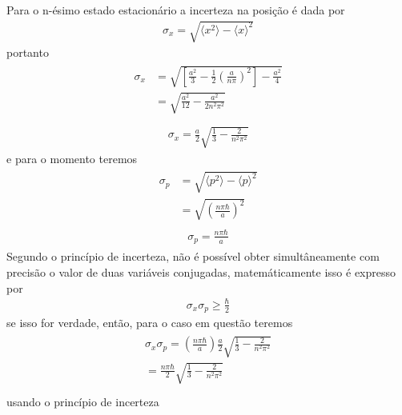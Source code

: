 \begin{prob}
\begin{sol}
		Para o n-ésimo estado estacionário a incerteza na posição é dada por	
		\begin{align}
			\sigma_{x}=\sqrt{\langle x^{2} \rangle -\langle x \rangle^{2}}
		\end{align}
		portanto	
		\begin{align}
			\begin{split}
				\sigma_{x} &= \sqrt{\left[\frac{a^{2}}{3}-\frac{1}{2}\left(\frac{a}{n \pi}\right)^{2}\right]-\frac{a^{2}}{4}}\\
									 &= \sqrt{\frac{a^{2}}{12}-\frac{a^{2}}{2n^{2} \pi^{2}}}\\
			\end{split}
		\end{align}
		\begin{align}
			\boxed{
				\sigma_{x} = \frac{a}{2}\sqrt{\frac{1}{3}-\frac{2}{n^{2} \pi^{2}}}
			}
		\end{align}
		e para o momento teremos
		\begin{align}
			\begin{split}
				\sigma_{p} &= \sqrt{\langle p^{2} \rangle-\langle p \rangle^{2}}\\
									 &= \sqrt{\left(\frac{n \pi \hbar}{a}\right)^{2}}
			\end{split}
		\end{align}
		\begin{align}
			\begin{split}
				\boxed{
					\sigma_{p} = \frac{n \pi \hbar}{a}
				}
			\end{split}				
		\end{align}
		Segundo o princípio de incerteza, não é possível obter simultâneamente com precisão o valor de duas variáveis conjugadas, matemáticamente isso é expresso por
		\begin{align}
			\sigma_{x} \sigma_{p}\geq \frac{\hbar}{2}
		\end{align}
		se isso for verdade, então, para o caso em questão teremos
		\begin{align}
			\begin{split}
				\sigma_{x} \sigma_{p} = \left(\frac{n \pi \hbar}{a}\right)\frac{a}{2}\sqrt{\frac{1}{3}-\frac{2}{n^{2} \pi^{2}}}\\
				= \frac{n \pi \hbar}{2}\sqrt{\frac{1}{3}-\frac{2}{n^{2} \pi^{2}}}\\
			\end{split}
		\end{align}
		usando o princípio de incerteza
		\begin{align}

\end{align}
\end{sol}
\end{prob}
